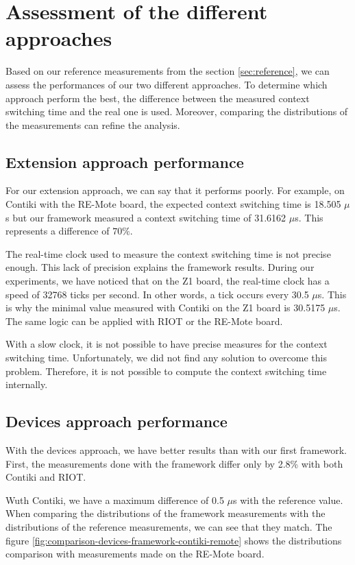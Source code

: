 \section{Assessment of the different approaches}

Based on our reference measurements from the section \ref{sec:reference}, we can assess the performances of our two different approaches.
To determine which approach perform the best, the difference between the measured context switching time and the real one is used.
Moreover, comparing the distributions of the measurements can refine the analysis.

\subsection{Extension approach performance}

For our extension approach, we can say that it performs poorly.
For example, on Contiki with the RE-Mote board, the expected context switching time is 18.505 $\mu$s but our framework measured a context switching time of 31.6162 $\mu$s.
This represents a difference of $70\%$.

The real-time clock used to measure the context switching time is not precise enough.
This lack of precision explains the framework results.
During our experiments, we have noticed that on the Z1 board, the real-time clock has a speed of 32768 ticks per second.
In other words, a tick occurs every 30.5 $\mu$s.
This is why the minimal value measured with Contiki on the Z1 board is 30.5175 $\mu$s.
The same logic can be applied with RIOT or the RE-Mote board.

With a slow clock, it is not possible to have precise measures for the context switching time.
Unfortunately, we did not find any solution to overcome this problem.
Therefore, it is not possible to compute the context switching time internally.

\subsection{Devices approach performance}

With the devices approach, we have better results than with our first framework.
First, the measurements done with the framework differ only by 2.8\% with both Contiki and RIOT.

Wuth Contiki, we have a maximum difference of 0.5 $\mu$s with the reference value.
When comparing the distributions of the framework measurements with the distributions of the reference measurements, we can see that they match.
The figure \ref{fig:comparison-devices-framework-contiki-remote} shows the distributions comparison with measurements made on the RE-Mote board.

